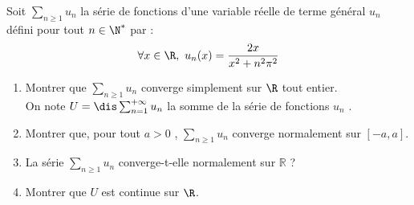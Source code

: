 \documentclass[a4paper,10pt]{report}
\newcommand{\Sum}[2]{\ensuremath{\textstyle{\sum\limits_{#1}^{#2}}}}
\begin{document}
\begin{Exercice}{}  Soit $\Sum{n \geq 1}{} u_n$ la s\'erie de fonctions d'une variable r\'eelle de terme g\'en\'eral $u_n$ d\'efini pour tout $n \in \N^*$ par : 
$$ \forall x \in \R ,\ u_n(x)=\dfrac{2x}{x^2+n^2\pi^2}$$
\begin{enumerate}
\item Montrer que $\Sum{n \geq 1}{} u_n$ converge simplement sur $\R$ tout entier.\\

\noindent On note $U=\dis \sum_{n=1}^{+\infty}{u_n}$ la somme de la s\'erie de fonctions $u_n$ .
\item Montrer que, pour tout $a > 0$ , $\Sum{n \geq 1}{} u_n$ converge normalement sur $[-a,a]$.
\item La s\'erie $\Sum{n \geq 1}{} u_n$ converge-t-elle normalement sur $\mathbb{R}$ ?
\item Montrer que $U$ est continue sur $\R$.
\end{enumerate}
\end{Exercice}
\end{document}
